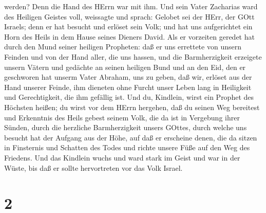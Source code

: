 werden? Denn die Hand des HErrn war mit ihm.  Und sein
Vater Zacharias ward des Heiligen Geistes voll, weissagte und sprach:
 Gelobet sei der HErr, der GOtt Israels; denn er hat
besucht und erlöset sein Volk;  und hat uns aufgerichtet
ein Horn des Heils in dem Hause seines Dieners David.  Als
er vorzeiten geredet hat durch den Mund seiner heiligen Propheten:
 daß er uns errettete von unsern Feinden und von der Hand
aller, die uns hassen,  und die Barmherzigkeit erzeigete
unsern Vätern und gedächte an seinen heiligen Bund  und an
den Eid, den er geschworen hat unserm Vater Abraham, uns zu geben,
 daß wir, erlöset aus der Hand unserer Feinde, ihm dieneten
ohne Furcht unser Leben lang  in Heiligkeit und
Gerechtigkeit, die ihm gefällig ist.  Und du, Kindlein,
wirst ein Prophet des Höchsten heißen; du wirst vor dem HErrn hergehen,
daß du seinen Weg bereitest  und Erkenntnis des Heils
gebest seinem Volk, die da ist in Vergebung ihrer Sünden, 
durch die herzliche Barmherzigkeit unsers GOttes, durch welche uns
besucht hat der Aufgang aus der Höhe,  auf daß er erscheine
denen, die da sitzen in Finsternis und Schatten des Todes und richte
unsere Füße auf den Weg des Friedens.  Und das Kindlein
wuchs und ward stark im Geist und war in der Wüste, bis daß er sollte
hervortreten vor das Volk Israel.

\hypertarget{section-1}{%
\section{2}\label{section-1}}

